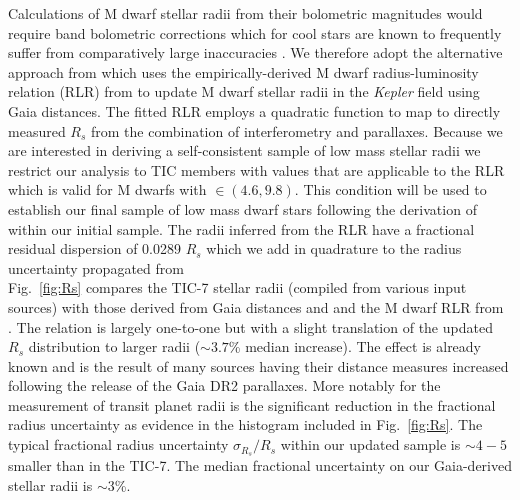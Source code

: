 Calculations of M dwarf stellar radii from their bolometric magnitudes would require \Ks{-}band bolometric
corrections which for cool stars are known to frequently suffer from comparatively large inaccuracies 
\citep[\teff{} $\lesssim 4100$ K;][]{berger18}. We therefore adopt the alternative approach from
\cite{berger18} which uses the empirically-derived M dwarf radius-luminosity relation (RLR) from
\cite{mann15} to update M dwarf stellar radii in the \emph{Kepler} field using Gaia distances.
The fitted RLR employs a quadratic function to map
\MK{} to directly measured $R_s$ from the combination of interferometry and parallaxes.
Because we are interested in deriving a
self-consistent sample of low mass stellar radii we restrict our
analysis to TIC members with \MK{} values that are applicable to the \cite{mann15} RLR which
is valid for M dwarfs with \MK{} $\in (4.6,9.8)$. This condition will be used to establish our final
sample of low mass dwarf stars following the derivation of \teff{} within our initial sample.
The radii inferred from the RLR have a fractional residual dispersion of 0.0289 $R_s$ which we add
in quadrature to the radius uncertainty propagated from  \\

Fig.~\ref{fig:Rs} compares the TIC-7 stellar radii (compiled from various input sources) with those
derived from Gaia distances and and the M dwarf RLR from \cite{mann15}. The relation is largely one-to-one
but with a slight translation of the updated $R_s$ distribution to larger radii ($\sim 3.7$\% median increase).
The effect is already known \citep{berger18} and is the result of many sources having their distance
measures increased following the release of the Gaia DR2 parallaxes. More notably for the measurement of
transit planet radii is the significant reduction in the fractional radius uncertainty as evidence in the
histogram included in Fig.~\ref{fig:Rs}. The typical fractional radius uncertainty $\sigma_{R_{s}}/R_s$ within
our updated sample is $\sim 4-5$ smaller than in the TIC-7. The median fractional uncertainty on our
Gaia-derived stellar radii is $\sim 3$\%.

